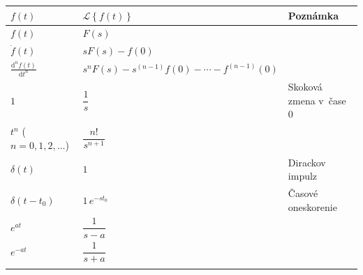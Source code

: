 \documentclass[a4paper, 10pt, ]{article}
\begin{document}
\normalsize
\normalfont











\newcommand{\Laplace}[1]{\ensuremath{\mathcal{L}{\left\{#1\right\}}}}
\newcommand{\InvLap}[1]{\ensuremath{\mathcal{L}^{-1}{\left\{#1\right\}}}}


\noindent
\begin{longtable}[l]{p{3.7cm} @{} p{5.9cm} p{2.8cm}}

    \toprule
    $f(t)$                                  & $\Laplace{f(t)}$   & {\color{Gray} \scriptsize Poznámka} \\
    \midrule
    \addlinespace[5mm]
    \endhead



    $f(t)$                                  & $F(s)$                                \\[4mm]
    $\dot f(t)$                             & $sF(s) - f(0)$                        \\[4mm]
    $\displaystyle \frac{\text{d}^n f(t)}{\text{d}t^n}$                                 & $s^nF(s) - s^{(n-1)} f(0) - \cdots - f^{(n-1)}(0)$ \\[4mm]    
    \midrule \addlinespace[4mm]


    $1$                                     & $\dfrac{1}{s}$                        & {\color{Gray} \scriptsize Skoková zmena v~čase~$0$}  \\[4mm]
    $t^n$ ($n=0,1,2,\dots$)                 & $\dfrac{n!}{s^{n+1}}$                 \\[4mm]
    \midrule \addlinespace[4mm]


    $\delta(t)$                             & $1$                                   & {\color{Gray} \scriptsize Dirackov impulz} \\[4mm]
    $\delta(t-t_0)$                         & $1 \, e^{-st_0}$                      & {\color{Gray} \scriptsize Časové oneskorenie} \\[4mm]
    \midrule \addlinespace[4mm]
        
    
    $e^{at}$                                & $\dfrac{1}{s-a}$                      \\[4mm]
    $e^{-at}$                                & $\dfrac{1}{s+a}$                     \\[4mm]
    \midrule \addlinespace[4mm]



\end{longtable}
\end{document}
